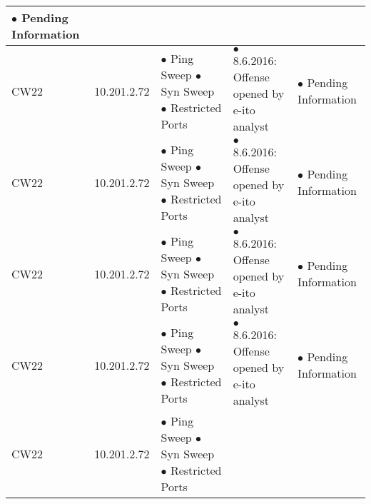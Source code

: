 \begin{center}
\begin{longtable}{|p{2cm}|p{}|p{4cm}|p{6cm}|p{4cm}|}
$\bullet$ Pending Information %
\\
\hline %
CW22 & %

10.201.2.72 & %

$\bullet$ Ping Sweep \newline %
$\bullet$ Syn Sweep \newline
$\bullet$ Restricted Ports &

$\bullet$ 8.6.2016: Offense opened by e-ito analyst & %

$\bullet$ Pending Information %
\\
\hline %
CW22 & %

10.201.2.72 & %

$\bullet$ Ping Sweep \newline %
$\bullet$ Syn Sweep \newline
$\bullet$ Restricted Ports &

$\bullet$ 8.6.2016: Offense opened by e-ito analyst & %

$\bullet$ Pending Information %
\\
\hline %
CW22 & %

10.201.2.72 & %

$\bullet$ Ping Sweep \newline %
$\bullet$ Syn Sweep \newline
$\bullet$ Restricted Ports &

$\bullet$ 8.6.2016: Offense opened by e-ito analyst & %

$\bullet$ Pending Information %
\\
\hline %
CW22 & %

10.201.2.72 & %

$\bullet$ Ping Sweep \newline %
$\bullet$ Syn Sweep \newline
$\bullet$ Restricted Ports &

$\bullet$ 8.6.2016: Offense opened by e-ito analyst & %

$\bullet$ Pending Information %
\\
\hline %
CW22 & %

10.201.2.72 & %

$\bullet$ Ping Sweep \newline %
$\bullet$ Syn Sweep \newline
$\bullet$ Restricted Ports &


\end{longtable}
\end{center}
